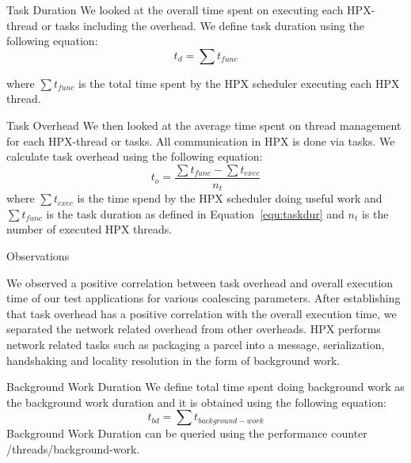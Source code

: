\documentclass[10pt]{beamer}
\begin{document}
\begin{frame}{Task Duration}
We looked at the overall time spent on executing each HPX-thread or tasks including the overhead. We define task duration using the following equation:
%
\begin{equation}
t_{d} = \sum{t_{func}}
\label{equ:taskdur}
\end{equation}

where $\sum{t_{func}}$ is the total time spent by the HPX scheduler executing each HPX thread.
\end{frame}

\begin{frame}{Task Overhead}
We then looked at the average time spent on thread management for each HPX-thread or tasks. All communication in HPX is done via tasks. We calculate task overhead using the following equation:
%
\begin{equation}
t_{o} = \frac{\sum{t_{func}}-\sum{t_{exec}}}{n_t}
\label{equ:taskoverhead}
\end{equation}
where ${\sum{t_{exec}}}$ is the time spend by the HPX scheduler doing useful work and  ${\sum{t_{func}}}$ is the task duration as defined in Equation~\ref{equ:taskdur} and ${n_t}$ is the number of executed HPX threads.

\end{frame}

\begin{frame}{Observations}
\begin{outline}
	\1 We observed a positive correlation between task overhead and overall execution time of our test applications for various coalescing parameters.
	\1 After establishing that task overhead has a positive correlation with the overall execution time, we separated the network related overhead from other overheads.
	\1 HPX performs network related tasks such as packaging a parcel into a message, serialization, handshaking and locality resolution in the form of background work.
\end{outline}
\end{frame}

\begin{frame}{Background Work Duration}
 We define total time spent doing background work as the background work duration and it is obtained using the following equation:
\begin{equation}
t_{bd} = \sum{t_{{background-work}}}
\label{equ:bgdur}
\end{equation}
Background Work Duration can be queried using the performance counter \alert{/threads/background-work}.
\end{frame}
\end{document}
